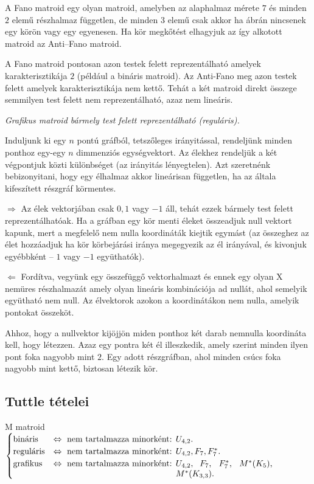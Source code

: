 A Fano matroid egy olyan matroid, amelyben az alaphalmaz mérete $7$ és minden
$2$ elemű részhalmaz független, de minden $3$ elemű csak akkor ha
 ábrán nincsenek egy körön vagy egy egyenesen. Ha kör megkőtést
elhagyjuk az így alkotott matroid az Anti--Fano matroid.

A Fano matroid pontosan azon testek felett reprezentálható amelyek
karakterisztikája $2$ (például a bináris matroid). Az Anti-Fano meg azon testek
felett amelyek karakterisztikája nem kettő. Tehát a két matroid direkt összege
semmilyen test felett nem reprezentálható, azaz nem lineáris.

\vspace{0.4cm}
\emph{Grafikus matroid bármely test felett reprezentálható (reguláris).}
\vspace{0.4cm}

Induljunk ki egy $n$ pontú gráfból, tetszőleges irányitással, rendeljünk minden
ponthoz egy-egy $n$ dimmenziós egységvektort. Az élekhez rendeljük a két
végpontjuk közti különbséget (az irányitás lényegtelen). Azt szeretnénk
bebizonyitani, hogy egy élhalmaz akkor lineárisan független, ha az általa
kifeszített részgráf körmentes.

$\Rightarrow$  Az élek vektorjában csak $0,1$ vagy $-1$ áll, tehát ezzek bármely
test felett reprezentálhatóak. Ha a gráfban egy kör menti éleket összeadjuk null vektort
kapunk, mert a megfelelő nem nulla koordináták kiejtik egymást (az összeghez az
élet hozzáadjuk ha kör körbejárási iránya megegyezik az él irányával, és
kivonjuk egyébbként -- $1$ vagy $-1$ együthatók).

$\Leftarrow$ Fordítva, vegyünk egy összefüggő vektorhalmazt és ennek egy olyan X
nemüres részhalmazát amely olyan lineáris kombinációja ad nullát, ahol semelyik
együtható nem null. Az élvektorok azokon a koordinátákon nem nulla, amelyik
pontokat összeköt. 

Ahhoz, hogy a nullvektor kijöjjön miden ponthoz két darab nemnulla koordináta
kell, hogy létezzen. Azaz egy pontra két él illeszkedik, amely szerint minden
ilyen pont foka nagyobb mint $2$.  Egy adott részgráfban, ahol minden csúcs foka
nagyobb mint kettő, biztosan létezik kör.

\subsection{Tuttle tételei}

M matroid $\begin{cases}
\mbox{bináris} &\Leftrightarrow \mbox{ nem tartalmazza minorként: } U_{4,2}. \\ 
\mbox{reguláris} &\Leftrightarrow \mbox{ nem tartalmazza minorként: } U_{4,2}, F_7, F_7^*. \\
\mbox{grafikus} &\Leftrightarrow \mbox{ nem tartalmazza minorként: } \parbox[t]{4cm}{
$U_{4,2},$ $F_7$, $F_7^*$, $M^*(K_5)$, $M^*(K_{3,3})$.} \\
\end{cases}$

